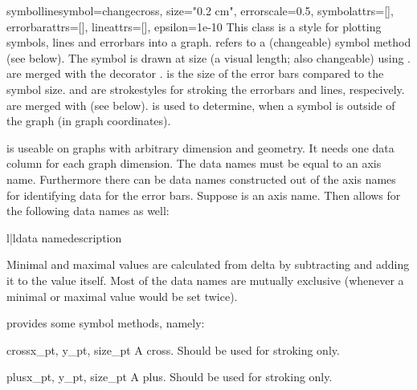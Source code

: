 \begin{classdesc}{symbolline}{symbol=changecross, size="0.2 cm",
                              errorscale=0.5, symbolattrs=[],
                              errorbarattrs=[], lineattrs=[],
                              epsilon=1e-10}
  This class is a style for plotting symbols, lines and errorbars into a
  graph.  refers to a (changeable) symbol method (see
  below). The symbol is drawn at size  (a visual \PyX{}
  length; also changeable) using . 
  are merged with the decorator . 
  is the size of the error bars compared to the symbol size.
   and  are strokestyles for
  stroking the errorbars and lines, respecively.  are
  merged with  (see below).  is used
  to determine, when a symbol is outside of the graph (in graph
  coordinates).

   is useable on graphs with arbitrary dimension and
  geometry. It needs one data column for each graph dimension. The
  data names must be equal to an axis name. Furthermore there can be
  data names constructed out of the axis names for identifying data
  for the error bars. Suppose  is an axis name. Then
   allows for the following data names as well:

  \begin{tableii}{l|l}{}{data name}{description}
  \end{tableii}

  Minimal and maximal values are calculated from delta by subtracting
  and adding it to the value itself. Most of the data names are mutually
  exclusive (whenever a minimal or maximal value would be set twice).
\end{classdesc}

 provides some symbol methods, namely:

\begin{methoddesc}{cross}{x_pt, y_pt, size_pt}
  A cross. Should be used for stroking only.
\end{methoddesc}

\begin{methoddesc}{plus}{x_pt, y_pt, size_pt}
  A plus. Should be used for stroking only.
\end{methoddesc}


